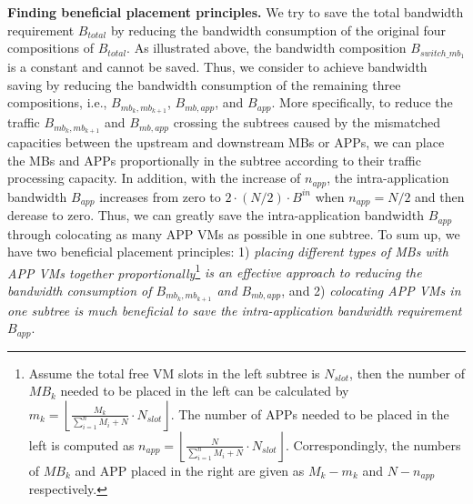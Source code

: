 \documentclass[review]{elsarticle}
\begin{document}


\textbf{Finding beneficial placement principles.} We try to save the total bandwidth requirement $B_{total}$ by reducing the bandwidth consumption of the original four compositions of $B_{total}$. As illustrated above, the bandwidth composition $B_{switch\_mb_1}$ is a constant and cannot be saved.
Thus, we consider to achieve bandwidth saving by reducing the bandwidth consumption of the remaining three compositions, i.e., $B_{mb_k,mb_{k+1}}$, $B_{mb,app}$, and $B_{app}$. %
More specifically, to reduce the traffic $B_{mb_k,mb_{k+1}}$ and $B_{mb,app}$ crossing the subtrees caused by the mismatched capacities between the upstream and downstream MBs or APPs, we can place the MBs and APPs proportionally in the subtree according to their traffic processing capacity. In addition, %
with the increase of $n_{app}$, the intra-application bandwidth $B_{app}$ increases from zero to $2\cdot (N/2)\cdot B^{in}$ when $n_{app} = N/2$ and then derease to zero. Thus, we can greatly save the intra-application bandwidth $B_{app}$ through colocating as many APP VMs as possible in one subtree. To sum up, we have two beneficial placement principles: 1) \emph{placing different types of MBs with APP VMs together proportionally}\footnote{Assume the total free VM slots in the left subtree is $N_{slot}$, then the number of $MB_k$ needed to be 
	placed in the left can be calculated by $m_k=\left\lfloor\frac{M_k}{\sum\nolimits_{i=1}^{n}M_i+N}\cdot N_{slot}\right\rfloor$. The number of APPs needed to be placed in the left is computed as $n_{app}=\left\lfloor\frac{N}{\sum\nolimits_{i=1}^{n}M_i+N}\cdot N_{slot}\right\rfloor$. Correspondingly, the numbers of $MB_k$ and APP placed in the right are given as $M_k-m_k$ and $N-n_{app}$ respectively.} \emph{is an effective approach to reducing the bandwidth consumption of $B_{mb_k,mb_{k+1}}$ and $B_{mb,app}$}, and 2) \emph{colocating APP VMs in one subtree is much beneficial to save the intra-application bandwidth requirement $B_{app}$}. 
\end{document}
